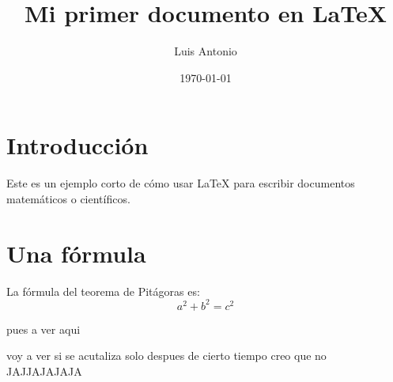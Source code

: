\documentclass{article}
\title{Mi primer documento en \LaTeX}
\author{Luis Antonio}
\date{\today}
\begin{document}
\maketitle

\section{Introducción}
Este es un ejemplo corto de cómo usar \LaTeX{} para escribir documentos matemáticos o científicos.

\section{Una fórmula}
La fórmula del teorema de Pitágoras es:
\[
a^2 + b^2 = c^2
\]

pues a ver aqui

voy a ver si se acutaliza solo despues de cierto tiempo creo que no JAJJAJAJAJA
\end{document}
